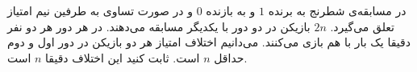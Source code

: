 \EXERCISE
در مسابقه‌ی شطرنج به برنده
$1$
و به بازنده
$0$
و در صورت تساوی به طرفین نیم امتیاز تعلق می‌گیرد.
$2n$
بازیکن در دو دور با یکدیگر مسابقه می‌دهند. در هر دور هر دو نفر دقیقا یک بار با هم بازی می‌کنند. می‌دانیم اختلاف امتیاز هر دو بازیکن در دور اول و دوم حداقل
$n$
است. ثابت کنید این اختلاف دقیقا
$n$
است.